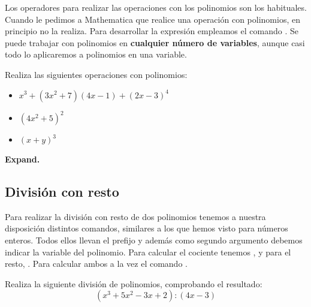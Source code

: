 \documentclass[a4paper,10pt, draft]{article}
\newcommand{\com}[1]{\textbf{\color{blue}{#1}}}
\newenvironment{ejer}{\begin{tcolorbox}[center title, title=Ejercicios,
fonttitle=\sffamily\bfseries,colback=blue!5,colframe=orange]}{\end{tcolorbox}}
\newenvironment{funciones}{\begin{tcolorbox}[center title, title=Nuevas funciones, fonttitle=\sffamily\bfseries, colback=green!5!white,colframe=red!75!black]}{\end{tcolorbox}\bigskip}
\begin{document}
Los operadores para realizar las operaciones con los polinomios son los habituales.
Cuando le pedimos a Mathematica que realice una operación con polinomios, en principio no la realiza. Para desarrollar la expresión empleamos el comando \com{Expand[p]}. Se puede trabajar con polinomios en \textbf{cualquier número de variables}, aunque casi todo lo aplicaremos  a polinomios en una variable.

\begin{ejer}

Realiza las siguientes operaciones con polinomios:

\begin{itemize}

\item  $x^3+(3x^2+7)(4x-1)+(2x-3)^4$


\item $(4x^2+5)^2$


\item $(x+y)^3$

\end{itemize}

\end{ejer}  



\begin{funciones}

\textbf{Expand.}


\end{funciones}


\newpage

\subsection{División con resto}

Para realizar la división con resto de dos polinomios tenemos a nuestra disposición distintos comandos, similares a los que hemos visto para números enteros. Todos ellos llevan el prefijo \com{Polynomial} y además como segundo argumento debemos indicar la variable del polinomio. Para calcular el cociente tenemos \com{PolynomialQuotient[p,q,x]}, y para el resto, \com{PolynomialRemainder[p,q,x]}. Para calcular ambos a la vez el comando \com{Polynomial\-Quotient\-Remainder[p,q,x]}.

\begin{ejer}

Realiza la siguiente división de polinomios, comprobando el resultado:
 $$
 (x^3+5x^2-3x+2):(4x-3)
 $$
 
 \end{ejer} 
 
\end{document}
